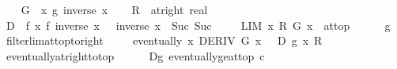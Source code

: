 \begin{isabellebody}
\ \ \isamarkupfalse%
\ {\isacharquery}{\kern0pt}G\ {\isacharequal}{\kern0pt}\ {\isachardoublequoteopen}{\isasymlambda}x{\isachardot}{\kern0pt}\ g\ {\isacharparenleft}{\kern0pt}inverse\ x{\isacharparenright}{\kern0pt}{\isachardoublequoteclose}\isanewline
\ \ \isamarkupfalse%
\ {\isacharquery}{\kern0pt}R\ {\isacharequal}{\kern0pt}\ {\isachardoublequoteopen}at{\isacharunderscore}{\kern0pt}right\ {\isacharparenleft}{\kern0pt}{}{\isacharcolon}{\kern0pt}{\isacharcolon}{\kern0pt}real{\isacharparenright}{\kern0pt}{\isachardoublequoteclose}\isanewline
\ \ \isamarkupfalse%
\ {\isacharquery}{\kern0pt}D\ {\isacharequal}{\kern0pt}\ {\isachardoublequoteopen}{\isasymlambda}f{\isacharprime}{\kern0pt}\ x{\isachardot}{\kern0pt}\ f{\isacharprime}{\kern0pt}\ {\isacharparenleft}{\kern0pt}inverse\ x{\isacharparenright}{\kern0pt}\ {\isacharasterisk}{\kern0pt}\ {\isacharminus}{\kern0pt}\ {\isacharparenleft}{\kern0pt}inverse\ x\ {\isacharcircum}{\kern0pt}\ Suc\ {\isacharparenleft}{\kern0pt}Suc\ {}{\isacharparenright}{\kern0pt}{\isacharparenright}{\kern0pt}{\isachardoublequoteclose}\isanewline
\ \ \isamarkupfalse%
\ {\isachardoublequoteopen}LIM\ x\ {\isacharquery}{\kern0pt}R{\isachardot}{\kern0pt}\ {\isacharquery}{\kern0pt}G\ x\ {\isacharcolon}{\kern0pt}{\isachargreater}{\kern0pt}\ at{\isacharunderscore}{\kern0pt}top{\isachardoublequoteclose}\isanewline
\ \ \ \ \isamarkupfalse%
\ g{\isacharunderscore}{\kern0pt}{}\ \isamarkupfalse%
\ filterlim{\isacharunderscore}{\kern0pt}at{\isacharunderscore}{\kern0pt}top{\isacharunderscore}{\kern0pt}to{\isacharunderscore}{\kern0pt}right\ \isacommand{{\isachardot}{\kern0pt}}\isamarkupfalse%
\isanewline
\ \ \isamarkupfalse%
\ {\isachardoublequoteopen}eventually\ {\isacharparenleft}{\kern0pt}{\isasymlambda}x{\isachardot}{\kern0pt}\ DERIV\ {\isacharquery}{\kern0pt}G\ x\ \ {\isacharcolon}{\kern0pt}{\isachargreater}{\kern0pt}\ {\isacharquery}{\kern0pt}D\ g{\isacharprime}{\kern0pt}\ x{\isacharparenright}{\kern0pt}\ {\isacharquery}{\kern0pt}R{\isachardoublequoteclose}\isanewline
\ \ \ \ \isamarkupfalse%
\ eventually{\isacharunderscore}{\kern0pt}at{\isacharunderscore}{\kern0pt}right{\isacharunderscore}{\kern0pt}to{\isacharunderscore}{\kern0pt}top\isanewline
\ \ \ \ \isamarkupfalse%
\ Dg\ eventually{\isacharunderscore}{\kern0pt}ge{\isacharunderscore}{\kern0pt}at{\isacharunderscore}{\kern0pt}top{\isacharbrackleft}{\kern0pt}\ c{\isacharequal}{\kern0pt}{}{\isacharbrackright}{\kern0pt}\isanewline

\end{isabellebody}
